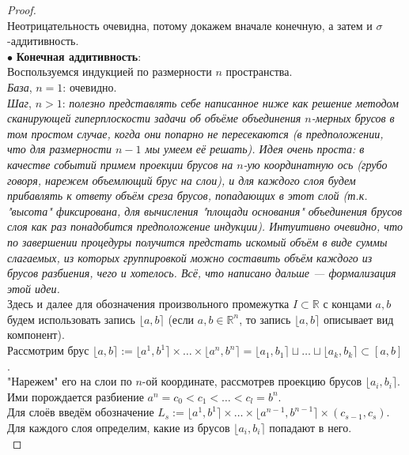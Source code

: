 \documentclass[11pt,a4paper]{report}
\def\Real{\mathbb{R}}
\theoremstyle{definition}
\theoremstyle{definition}
\theoremstyle{definition}
\begin{document}
	\begin{proof}$  $\\
		Неотрицательность очевидна, потому докажем вначале конечную, а затем и $ \sigma $-аддитивность.\\
		$ \bullet $ \textbf{Конечная аддитивность}:\\
		Воспользуемся индукцией по размерности $ n $ пространства.\\
		\textit{База}, $ n = 1 $: очевидно.\\
		\textit{Шаг}, $ n > 1 $: \textit{полезно представлять себе написанное ниже как решение методом сканирующей гиперплоскости задачи об объёме объединения $ n $-мерных брусов в том простом случае, когда они попарно не пересекаются (в предположении, что для размерности $ n-1 $ мы умеем её решать). Идея очень проста: в качестве событий примем проекции брусов на $ n $-ую координатную ось (грубо говоря, нарежем объемлющий брус на слои), и для каждого слоя будем прибавлять к ответу объём среза брусов, попадающих в этот слой (т.к. "высота" фиксирована, для вычисления "площади основания" объединения брусов слоя как раз понадобится предположение индукции). Интуитивно очевидно, что по завершении процедуры получится предстать искомый объём в виде суммы слагаемых, из которых группировкой можно составить объём каждого из брусов разбиения, чего и хотелось. Всё, что написано дальше — формализация этой идеи.}\\
		Здесь и далее для обозначения произвольного промежутка $ I \subset \mathbb{R} $ с концами $ a, b $ будем использовать запись $ \lfloor a, b \rceil $ (если $ a, b \in \Real^{n} $, то запись $ \lfloor a, b \rceil $ описывает вид компонент).\\
		Рассмотрим брус $ \lfloor a, b \rceil := \lfloor a^{1}, b^{1} \rceil \times \dots \times \lfloor a^{n}, b^{n} \rceil = \lfloor a_{1}, b_{1} \rceil \sqcup \dots \sqcup \lfloor a_{k}, b_{k} \rceil \subset [a, b] $.\\
		"Нарежем" его на слои по $ n $-ой координате, рассмотрев проекцию брусов $ \lfloor a_{i}, b_{i} \rceil $.\\
		Ими порождается разбиение $ a^{n} = c_{0} < c_{1} < \dots < c_{l} = b^{n} $.\\ 
		Для слоёв введём обозначение $ L_{s} := \lfloor a^{1}, b^{1} \rceil \times \dots \times \lfloor a^{n-1}, b^{n-1} \rceil \times (c_{s-1}, c_{s}) $.\\
		Для каждого слоя определим, какие из брусов $ \lfloor a_{i}, b_{i} \rceil $ попадают в него.\\

\end{proof}
\end{document}
